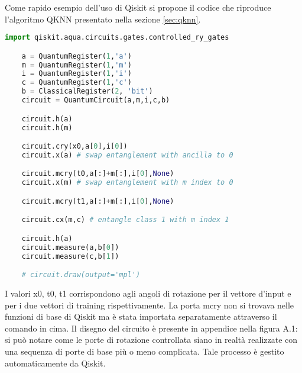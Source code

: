 Come rapido esempio dell'uso di Qiskit si propone il codice che riproduce 
l'algoritmo \ac{QKNN} presentato nella sezione \ref{sec:qknn}.

\begin{lstlisting}[float=h!,language=Python,frame=tb,caption={Algoritmo per il QKNN},label=lst:qknn]
    import qiskit.aqua.circuits.gates.controlled_ry_gates

    a = QuantumRegister(1,'a')
    m = QuantumRegister(1,'m')
    i = QuantumRegister(1,'i')
    c = QuantumRegister(1,'c')
    b = ClassicalRegister(2, 'bit')
    circuit = QuantumCircuit(a,m,i,c,b)

    circuit.h(a)
    circuit.h(m)

    circuit.cry(x0,a[0],i[0])
    circuit.x(a) # swap entanglement with ancilla to 0

    circuit.mcry(t0,a[:]+m[:],i[0],None)
    circuit.x(m) # swap entanglement with m index to 0

    circuit.mcry(t1,a[:]+m[:],i[0],None)

    circuit.cx(m,c) # entangle class 1 with m index 1

    circuit.h(a)
    circuit.measure(a,b[0])
    circuit.measure(c,b[1])

    # circuit.draw(output='mpl')
    \end{lstlisting}

    I valori x0, t0, t1 corrispondono agli angoli di rotazione per il vettore d'input e 
    per i due vettori di training rispettivamente. 
    La porta mcry non si trovava nelle funzioni di base di Qiskit ma è stata importata 
    separatamente attraverso il comando in cima. 
    Il disegno del circuito è presente in appendice nella figura A.1: si può notare 
    come le porte di rotazione controllata siano in realtà realizzate con una sequenza 
    di porte di base più o meno complicata. Tale processo è gestito automaticamente 
    da Qiskit. 